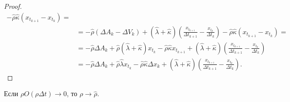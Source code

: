 \begin{proof}
\begin{align*}
        - \hat \rho \hat \kappa (x_{t_{k+1}} - x_{t_{k}}) =                                                                                                                                                               \\
                                                                                  & = -\hat \rho (\Delta A_k - \Delta V_k) +
        (\hat \lambda + \hat \kappa) \left(\frac{x_{t_{k+1}}}{\Delta t_{k+1}} - \frac{x_{t_k}}{\Delta t_{k}}\right)
        - \hat \rho \hat \kappa (x_{t_{k+1}} - x_{t_{k}}) =                                                                                                                                                               \\
                                                                                  & = -\hat \rho \Delta A_k + \hat \rho (\hat \lambda + \hat \kappa) x_{t_k} - \hat \rho \hat \kappa x_{t_{k+1}}
        + (\hat \lambda + \hat \kappa) \left(\frac{x_{t_{k+1}}}{\Delta t_{k+1}} - \frac{x_{t_k}}{\Delta t_{k}}\right)                                                                                                     \\
                                                                                  & = -\hat \rho \Delta A_k + \hat \rho \hat \lambda x_{t_k} - \hat \rho \hat \kappa \Delta x_k
        + (\hat \lambda + \hat \kappa) \left(\frac{x_{t_{k+1}}}{\Delta t_{k+1}} - \frac{x_{t_k}}{\Delta t_{k}}\right).
    \end{align*}

\end{proof}
\par

    \begin{theorem}\label{lilreg}
            Если $\rho O(\rho \Delta t) \rightarrow 0$, то $\rho \rightarrow \hat \rho$.
    \end{theorem}

